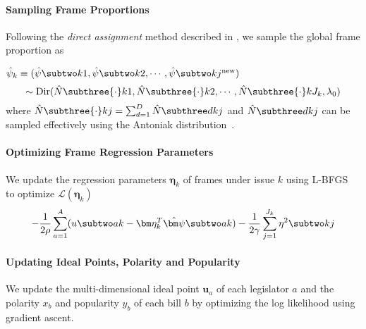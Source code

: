 \paragraph{Sampling Frame Proportions}

Following the \textit{direct assignment} method described in , we sample the global frame proportion as

$\hat{\psi}_k \equiv (\hat{\psi} \subtwo k1, \hat{\psi} \subtwo k2, \cdots, \hat{\psi} \subtwo k{j^{\mbox{\scriptsize new}}})$
\begin{equation}
 \sim \mbox{Dir} (\hat{N} \subthree {\cdot}k1, \hat{N} \subthree {\cdot}k2,
 \cdots, \hat{N} \subthree {\cdot}k{J_k}, \lambda_0)
\end{equation}
where $\hat{N} \subthree {\cdot}kj = \sum_{d=1}^D \hat{N} \subthree dkj$ and $\hat{N} \subthree
dkj$ can be sampled effectively using the Antoniak distribution~\cite{Aantoniak:AS74}.






\paragraph{Optimizing Frame Regression Parameters}
\label{subsec:c6_upadte_eta}

We update the regression parameters $\bm \eta_k$ of frames under issue $k$ using
L-BFGS~\cite{Liu:MP89:lbfgs} to optimize $\mathcal{L}(\bm \eta_k)$
\begin{equation}
  - \frac{1}{2 \rho} \sum_{a=1}^A (u \subtwo ak - \bm \eta_k^T \hat{\bm \psi} \subtwo ak)
  - \frac{1}{2 \gamma} \sum_{j=1}^{J_k} \eta^2 \subtwo kj
\end{equation}

\paragraph{Updating Ideal Points, Polarity and Popularity}
\label{subsec:c6_upadte_ideal_point}

We update the multi-dimensional ideal point $\bm u_a$ of each legislator $a$ and
the polarity $x_b$ and popularity $y_b$ of each bill $b$ by optimizing the log
likelihood using gradient ascent.
